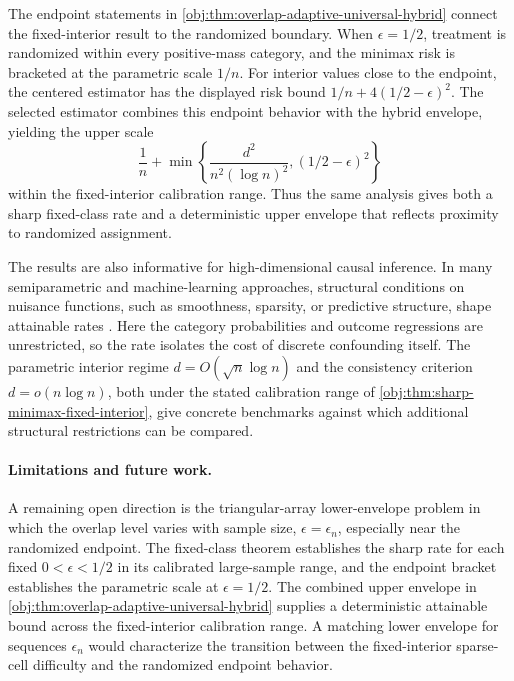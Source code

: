 The endpoint statements in \cref{obj:thm:overlap-adaptive-universal-hybrid} connect the fixed-interior result to the randomized boundary. When \(\epsilon=1/2\), treatment is randomized within every positive-mass category, and the minimax risk is bracketed at the parametric scale \(1/n\). For interior values close to the endpoint, the centered estimator has the displayed risk bound \(1/n+4(1/2-\epsilon)^2\). The selected estimator combines this endpoint behavior with the hybrid envelope, yielding the upper scale
\[
\frac1n+
\min\left\{
\frac{d^2}{n^2(\log n)^2},
(1/2-\epsilon)^2
\right\}
\]
within the fixed-interior calibration range. Thus the same analysis gives both a sharp fixed-class rate and a deterministic upper envelope that reflects proximity to randomized assignment.

The results are also informative for high-dimensional causal inference. In many semiparametric and machine-learning approaches, structural conditions on nuisance functions, such as smoothness, sparsity, or predictive structure, shape attainable rates \citep{Balakrishnan2023,JinSyrgkanis2025}. Here the category probabilities and outcome regressions are unrestricted, so the rate isolates the cost of discrete confounding itself. The parametric interior regime \(d=O(\sqrt n\log n)\) and the consistency criterion \(d=o(n\log n)\), both under the stated calibration range of \cref{obj:thm:sharp-minimax-fixed-interior}, give concrete benchmarks against which additional structural restrictions can be compared.

\paragraph{Limitations and future work.}
A remaining open direction is the triangular-array lower-envelope problem in which the overlap level varies with sample size, \(\epsilon=\epsilon_n\), especially near the randomized endpoint. The fixed-class theorem establishes the sharp rate for each fixed \(0<\epsilon<1/2\) in its calibrated large-sample range, and the endpoint bracket establishes the parametric scale at \(\epsilon=1/2\). The combined upper envelope in \cref{obj:thm:overlap-adaptive-universal-hybrid} supplies a deterministic attainable bound across the fixed-interior calibration range. A matching lower envelope for sequences \(\epsilon_n\) would characterize the transition between the fixed-interior sparse-cell difficulty and the randomized endpoint behavior.
